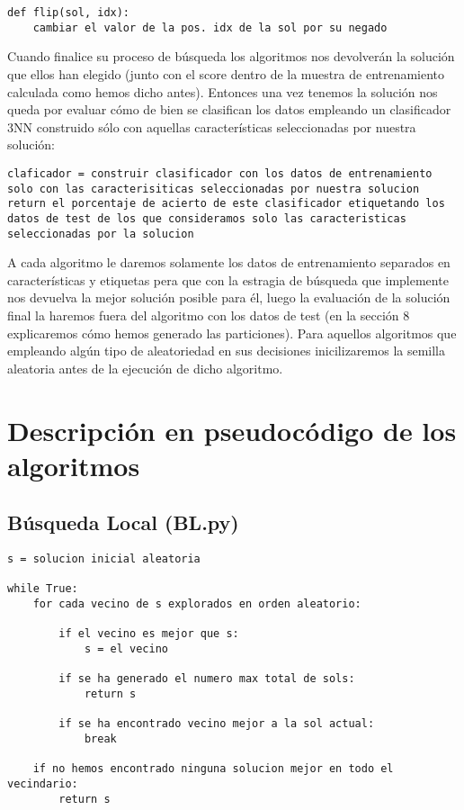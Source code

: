 \documentclass[10pt,a4paper]{article}
\begin{document}
\begin{lstlisting}
def flip(sol, idx):
	cambiar el valor de la pos. idx de la sol por su negado
\end{lstlisting}

Cuando finalice su proceso de búsqueda los algoritmos nos devolverán la solución que ellos han elegido (junto con el score dentro de la muestra de entrenamiento calculada como hemos dicho antes). Entonces una vez tenemos la solución nos queda por evaluar cómo de bien se clasifican los datos empleando un clasificador 3NN construido sólo con aquellas características seleccionadas por nuestra solución:\\

\begin{lstlisting}
claficador = construir clasificador con los datos de entrenamiento solo con las caracterisiticas seleccionadas por nuestra solucion
return el porcentaje de acierto de este clasificador etiquetando los datos de test de los que consideramos solo las caracteristicas seleccionadas por la solucion
\end{lstlisting}

A cada algoritmo le daremos solamente los datos de entrenamiento separados en características y etiquetas pera que con la estragia de búsqueda que implemente nos devuelva la mejor solución posible para él, luego la evaluación de la solución final la haremos fuera del algoritmo con los datos de test (en la sección 8 explicaremos cómo hemos generado las particiones). Para aquellos algoritmos que empleando algún tipo de aleatoriedad en sus decisiones inicilizaremos la semilla aleatoria antes de la ejecución de dicho algoritmo.	\\
\newpage

\section{\color[rgb]{0.0,0.0,0.21}Descripción en pseudocódigo de los algoritmos}
\subsection{\color[rgb]{0.0,0.0,0.51}Búsqueda Local (BL.py)}

\begin{lstlisting}
s = solucion inicial aleatoria

while True:
	for cada vecino de s explorados en orden aleatorio:
	
		if el vecino es mejor que s:
			s = el vecino
		
		if se ha generado el numero max total de sols:
			return s
			
		if se ha encontrado vecino mejor a la sol actual:
			break
			
	if no hemos encontrado ninguna solucion mejor en todo el vecindario:
		return s
\end{lstlisting}
\end{document}

